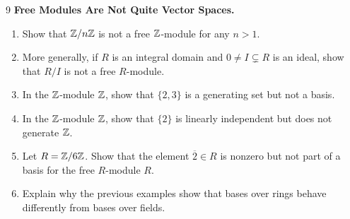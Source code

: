 \documentclass[Notebook.tex]{subfiles}
\begin{document}
    \begin{problem}{9}
        \textbf{Free Modules Are Not Quite Vector Spaces.}
    \begin{enumerate}
        \item Show that $\mathbb Z/n\mathbb Z$ is not a free $\mathbb Z$-module for any $n>1$.
        \item More generally, if $R$ is an integral domain and $0\neq I\subsetneq R$ is an ideal, show that $R/I$ is not a free $R$-module.
        \item In the $\mathbb Z$-module $\mathbb Z$, show that $\{2,3\}$ is a generating set but not a basis.
        \item In the $\mathbb Z$-module $\mathbb Z$, show that $\{2\}$ is linearly independent but does not generate $\mathbb Z$.
        \item Let $R=\mathbb Z/6\mathbb Z$. Show that the element $\overline{2}\in R$ is nonzero but not part of a basis for the free $R$-module $R$.
        \item Explain why the previous examples show that bases over rings behave differently from bases over fields.
        \end{enumerate}
    \end{problem}
\end{document}
